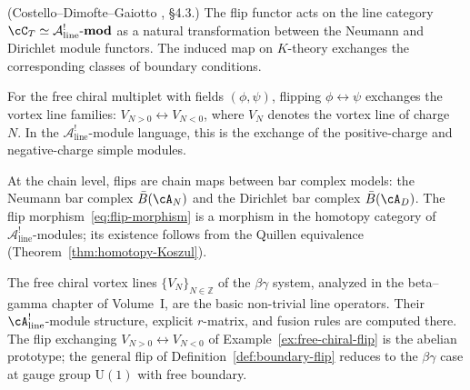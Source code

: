\begin{proposition}
\label{prop:flip-natural-transformation}
\textup{(Costello--Dimofte--Gaiotto \cite{CDG2023}, \S4.3.)}
The flip functor acts on the line category
$\cC_T \simeq \mathcal{A}^!_{\mathrm{line}}\text{-}\mathbf{mod}$ as a natural
transformation between the Neumann and Dirichlet module functors.
The induced map on $K$-theory exchanges the corresponding classes of
boundary conditions.
\end{proposition}

\begin{example}
\label{ex:free-chiral-flip}
For the free chiral multiplet with fields $(\phi, \psi)$, flipping
$\phi \leftrightarrow \psi$ exchanges the vortex line families:
$V_{N > 0} \leftrightarrow V_{N < 0}$, where $V_N$ denotes the vortex
line of charge~$N$. In the $\mathcal{A}^!_{\mathrm{line}}$-module language, this is the
exchange of the positive-charge and negative-charge simple modules.
\end{example}

\begin{remark}
\label{rem:flip-bar-cobar}
At the chain level, flips are chain maps between bar complex models:
the Neumann bar complex $\bar{B}(\cA_N)$ and the Dirichlet bar
complex $\bar{B}(\cA_D)$. The flip morphism~\eqref{eq:flip-morphism}
is a morphism in the homotopy category of
$\mathcal{A}^!_{\mathrm{line}}$-modules; its existence follows from
the Quillen equivalence (Theorem~\ref{thm:homotopy-Koszul}).
\end{remark}

\begin{remark}
\label{rem:vortex-line-prototype}
The free chiral vortex lines $\{V_N\}_{N \in \mathbb{Z}}$ of the
$\beta\gamma$ system, analyzed in the beta--gamma chapter of
Volume~I, are the basic non-trivial line operators. Their
$\cA^!_{\mathrm{line}}$-module structure, explicit $r$-matrix, and
fusion rules are computed there. The flip exchanging
$V_{N>0} \leftrightarrow V_{N<0}$ of
Example~\ref{ex:free-chiral-flip} is the abelian prototype; the
general flip of Definition~\ref{def:boundary-flip} reduces to the
$\beta\gamma$ case at gauge group $\mathrm{U}(1)$ with free
boundary.
\end{remark}

